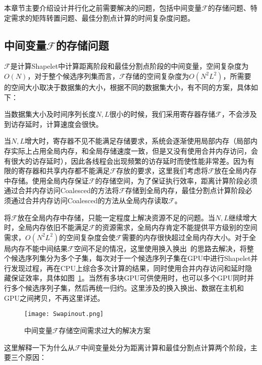 本章节主要介绍设计并行化之前需要解决的问题，包括中间变量$\mathcal{F}$的存储问题、特定需求的矩阵转置问题、最佳分割点计算的时间复杂度问题。

\subsection{中间变量$\mathcal{F}$的存储问题}
\label{cha:chap03:Problemsencountered:BigDataSet}

$\mathcal{F}$是计算Shapelet中计算距离阶段和最佳分割点阶段的中间变量，空间复杂度为$O(N)$，对于整个候选序列集而言，$\mathcal{F}$存储的空间复杂度为$O(N^2L^2)$，所需要的空间大小取决于数据集的大小，根据不同的数据集大小，有不同的方案，具体如下：

当数据集大小及时间序列长度$N,L$很小的时候，我们采用寄存器存储$\mathcal{F}$，不会涉及到访存延时，计算速度会很快。

当$N,L$增大时，寄存器不见不能满足存储要求，系统会逐渐使用局部内存（局部内存实际上占用全局内存，和全局存储速度一致，但是又没有使用合并内存访问，会有很大的访存延时），因此各线程会出现频繁的访存延时而使性能非常差。因为有限的寄存器和共享内存都不能满足$\mathcal{F}$存放的要求，这里我们考虑将$\mathcal{F}$放在全局内存中存储。使用全局内存保证$\mathcal{F}$的存储空间，为了保证执行效率，距离计算阶段必须通过合并内存访问Coalesced的方法将$\mathcal{F}$存储到全局内存，最佳分割点计算阶段必须通过合并内存访问Coalesced的方法从全局内存读取$\mathcal{F}$。

将$\mathcal{F}$放在全局内存中存储，只能一定程度上解决资源不足的问题。当$N,L$继续增大时，全局内存依旧不能满足$\mathcal{F}$的资源需求，全局内存肯定不能提供平方级别的空间需求，$O(N^2L^2)$的空间复杂度会使$\mathcal{F}$需要的内存很快超过全局内存大小。对于全局内存不能中间结果$\mathcal{F}$空间不足的情况，这里使用换入换出~\cite{li2016data}的思路去解决，将整个候选序列集分为多个子集，每次对于一个候选序列子集在GPU中进行Shapelet并行发现过程，再在CPU上综合多次计算的结果，同时使用合并内存访问和延时隐藏保证效率，具体如图~\ref{fig:Swapinout}。当然有多块GPU可供使用时，也可以多个GPU同时并行多个候选序列子集，然后再统一归约。这里涉及的换入换出、数据在主机和GPU之间拷贝，不再这里详述。

\begin{figure}[H] %
	\centering
	\texttt{[image: Swapinout.png]}
	\caption{中间变量$\mathcal{F}$存储空间需求过大的解决方案}
	\label{fig:Swapinout}
\end{figure}

这里解释一下为什么从$\mathcal{F}$中间变量处分为距离计算和最佳分割点计算两个阶段，主要三个原因：


